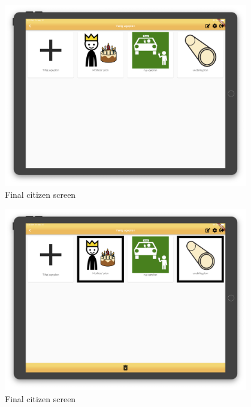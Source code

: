 \begin{figure}[H]
    \begin{center}
        \includegraphics[width=0.95\textwidth]{figures/FinalScreen/chooseWeekplanScreen.png}
    \end{center}
    \caption{Final citizen screen}
    \label{fig:finalCelectWeekplan}
\end{figure}

\begin{figure}[H]
    \begin{center}
        \includegraphics[width=0.95\textwidth]{figures/FinalScreen/editWeekplanScreen.png}
    \end{center}
    \caption{Final citizen screen}
    \label{fig:finalEditWeekplanSelector}
\end{figure}

